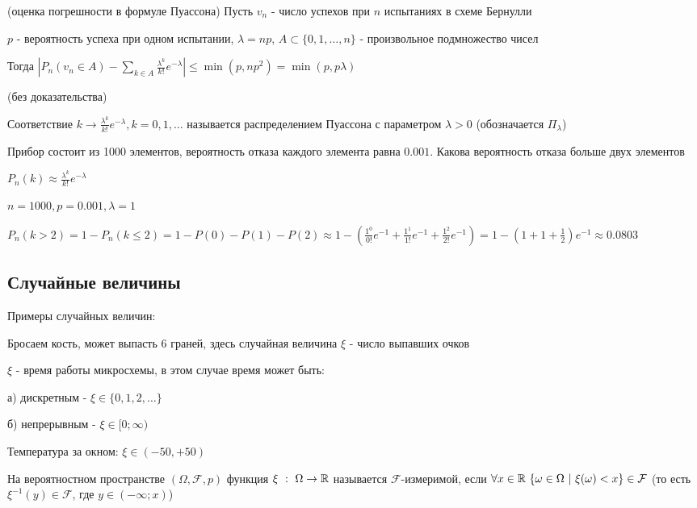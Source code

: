 \documentclass[12pt]{article}
\begin{document}
    \begin{MyTheorem}
         (оценка погрешности в формуле Пуассона) Пусть $v_n$ - число успехов при $n$ испытаниях в схеме Бернулли

        $p$ - вероятность успеха при одном испытании, $\lambda = np$, $A \subset \{0, 1, \dots, n\}$ - произвольное подмножество чисел

        Тогда $|P_n (v_n \in A) - \sum_{k \in A} \frac{\lambda^k}{k!} e^{-\lambda}| \leq \min (p, np^2) = \min (p, p\lambda)$

        (без доказательства)
    \end{MyTheorem}

    \Def Соответствие $k \to \frac{\lambda^k}{k!} e^{-\lambda}, k = 0, 1, \dots$ называется распределением Пуассона
    с параметром $\lambda > 0$ (обозначается $\Pi_\lambda$)

    \Ex Прибор состоит из 1000 элементов, вероятность отказа каждого элемента равна $0.001$. Какова вероятность отказа больше двух элементов

    $P_n(k) \approx \frac{\lambda^k}{k!} e^{-\lambda}$

    $n = 1000, p = 0.001, \lambda = 1$

    $P_n(k > 2) = 1 - P_n (k \leq 2) = 1 - P(0) - P(1) - P(2) \approx 1 - \left(\frac{1^0}{0!} e^{-1} + \frac{1^1}{1!} e^{-1} + \frac{1^2}{2!} e^{-1}\right) =
    1 - \left(1 + 1 + \frac{1}{2}\right) e^{-1} \approx 0.0803$


    \subsection{Случайные величины}

    Примеры случайных величин:

     Бросаем кость, может выпасть 6 граней, здесь случайная величина $\xi$ - число выпавших очков

     $\xi$ - время работы микросхемы, в этом случае время может быть:

    а) дискретным - $\xi \in \{0, 1, 2, \dots\}$

    б) непрерывным - $\xi \in [0; \infty)$

     Температура за окном: $\xi \in (-50, +50)$

    \Def На вероятностном пространстве $(\Omega, \mathcal{F}, p)$ функция $\xi \ : \ \Omega \to \mathbb{R}$ называется
    $\mathcal{F}$-измеримой, если $\forall x \in \mathbb{R} \ \{\omega \in \Omega \ | \ \xi(\omega) < x\} \in \mathcal{F}$
    (то есть $\xi^{-1}(y) \in \mathcal{F}$, где $y \in (-\infty; x)$)
\end{document}
